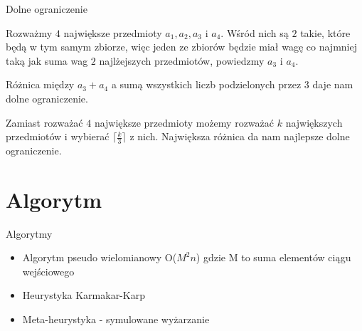 \documentclass{beamer}
\begin{document}
\begin{frame}[t]{Dolne ograniczenie}

Rozważmy $4$ największe przedmioty $a_1, a_2, a_3$ i $a_4$. Wśród nich są $2$ takie, które będą w tym samym zbiorze, więc jeden ze zbiorów będzie miał wagę co najmniej taką jak suma wag $2$ najlżejszych przedmiotów, powiedzmy $a_3$ i $a_4$.

Różnica między $a_3+a_4$ a sumą wszystkich liczb podzielonych przez $3$ daje nam dolne ograniczenie.

Zamiast rozważać $4$ największe przedmioty możemy rozważać $k$ największych przedmiotów i wybierać $\lceil \frac{k}{3} \rceil$ z nich. Największa różnica da nam najlepsze dolne ograniczenie.

\end{frame}

\section{Algorytm}

\begin{frame}{Algorytmy}


\begin{itemize}  
\item Algorytm pseudo wielomianowy O($M^2n$) gdzie M to suma elementów ciągu wejściowego
\item Heurystyka Karmakar-Karp
\item Meta-heurystyka - symulowane wyżarzanie
\end{itemize}

\end{frame}
\end{document}

